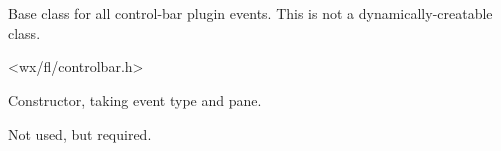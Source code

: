 %
%


\section{}\label{cbpluginevent}


Base class for all control-bar plugin events.
This is not a dynamically-creatable class.




<wx/fl/controlbar.h>




\label{cbplugineventcbpluginevent}


Constructor, taking event type and pane.


\label{cbplugineventclone}


Not used, but required.

